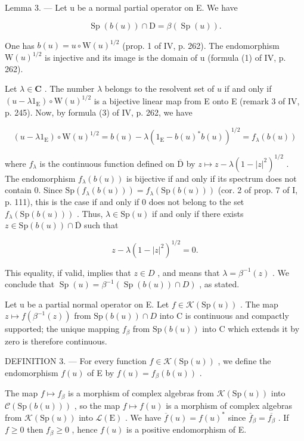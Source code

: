 Lemma 3. --- Let u be a normal partial operator on E. We have

\[
\operatorname{Sp} (b (u)) \cap \mathrm{D} = \beta (\operatorname{Sp} (u)).
\]

One has \(b(u) = u \circ \mathrm{W}(u)^{1/2}\) (prop. 1 of IV, p. 262). The endomorphism \(\mathrm{W}(u)^{1/2}\) is injective and its image is the domain of u (formula (1) of IV, p. 262).

Let \(\lambda \in \mathbf{C}\) . The number \(\lambda\) belongs to the resolvent set of \(u\) if and only if \((u - \lambda 1_{\mathrm{E}}) \circ \mathrm{W}(u)^{1/2}\) is a bijective linear map from E onto E (remark 3 of IV, p. 245). Now, by formula (3) of IV, p. 262, we have

\[
(u - \lambda 1 _ {\mathrm{E}}) \circ \mathrm{W} (u) ^ {1 / 2} = b (u) - \lambda (1 _ {\mathrm{E}} - b (u) ^ {*} b (u)) ^ {1 / 2} = f _ {\lambda} (b (u))
\]

where \(f_{\lambda}\) is the continuous function defined on \(\overline{\mathrm{D}}\) by \(z \mapsto z - \lambda (1 - |z|^2)^{1/2}\) . The endomorphism \(f_{\lambda}(b(u))\) is bijective if and only if its spectrum does not contain 0. Since \(\mathrm{Sp}(f_{\lambda}(b(u))) = f_{\lambda}(\mathrm{Sp}(b(u)))\) (cor. 2 of prop. 7 of I, p. 111), this is the case if and only if 0 does not belong to the set \(f_{\lambda}(\mathrm{Sp}(b(u)))\) . Thus, \(\lambda \in \mathrm{Sp}(u)\) if and only if there exists \(z \in \mathrm{Sp}(b(u)) \cap \overline{\mathrm{D}}\) such that

\[
z - \lambda (1 - | z | ^ {2}) ^ {1 / 2} = 0.
\]

This equality, if valid, implies that \(z \in D\) , and means that \(\lambda = \beta^{-1}(z)\) . We conclude that \(\operatorname{Sp}(u) = \beta^{-1}(\operatorname{Sp}(b(u)) \cap D)\) , as stated.

Let u be a partial normal operator on E. Let \(f \in \mathcal{K}(\mathrm{Sp}(u))\) . The map \(z \mapsto f(\beta^{-1}(z))\) from \(\mathrm{Sp}(b(u)) \cap D\) into C is continuous and compactly supported; the unique mapping \(f_{\beta}\) from \(\mathrm{Sp}(b(u))\) into C which extends it by zero is therefore continuous.

DEFINITION 3. --- For every function \(f \in \mathcal{K}(\mathrm{Sp}(u))\) , we define the endomorphism \(f(u)\) of E by \(f(u) = f_{\beta}(b(u))\) .

The map \(f \mapsto f_{\beta}\) is a morphism of complex algebras from \(\mathcal{K}(\mathrm{Sp}(u))\) into \(\mathcal{C}(\mathrm{Sp}(b(u)))\) , so the map \(f \mapsto f(u)\) is a morphism of complex algebras from \(\mathcal{K}(\mathrm{Sp}(u))\) into \(\mathcal{L}(\mathrm{E})\) . We have \(\overline{f}(u) = f(u)^*\) since \(\overline{f}_{\beta} = \overline{f_{\beta}}\) . If \(f \geqslant 0\) then \(f_{\beta} \geqslant 0\) , hence \(f(u)\) is a positive endomorphism of E.

